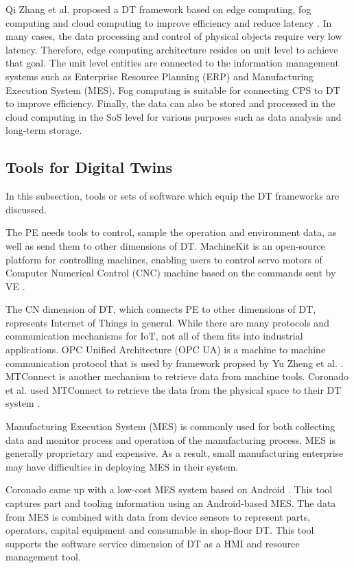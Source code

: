 \documentclass[article,table]{aaltoseries}
\begin{document}
Qi Zhang et al. proposed a DT framework based on edge computing, fog computing and cloud computing to improve efficiency and reduce latency \cite{qi2018modeling}. In many cases, the data processing and control of physical objects require very low latency. Therefore, edge computing architecture resides on unit level to achieve that goal. The unit level entities are connected to the information management systems such as Enterprise Resource Planning (ERP) and Manufacturing Execution System (MES). Fog computing is suitable for connecting CPS to DT to improve efficiency. Finally, the data can also be stored and processed in the cloud computing in the SoS level for various purposes such as data analysis and long-term storage.

\subsection{Tools for Digital Twins}
In this subsection, tools or sets of software which equip the DT frameworks are discussed. 

The PE needs tools to control, sample the operation and environment data, as well as send them to other dimensions of DT. MachineKit is an open-source platform for controlling machines, enabling users to control servo motors of Computer Numerical Control (CNC) machine based on the commands sent by VE \cite{lynn2018realization}.

The CN dimension of DT, which connects PE to other dimensions of DT, represents Internet of Things in general. While there are many protocols and communication mechanisms for IoT, not all of them fits into industrial applications. OPC Unified Architecture (OPC UA) is a machine to machine communication protocol that is used by framework propsed by Yu Zheng et al. \cite{zheng2019application}. MTConnect is another mechanism to retrieve data from machine tools. Coronado et al. used MTConnect to retrieve the data from the physical space to their DT system \cite{UrbinaCoronado2018}.

Manufacturing Execution System (MES) is commonly used for both collecting data and monitor process and operation of the manufacturing process. MES is generally proprietary and expensive. As a result, small manufacturing enterprise may have difficulties in deploying MES in their system.

Coronado  came up with a low-cost MES system based on Android \cite{UrbinaCoronado2018}. This tool captures part and tooling information using an Android-based MES. The data from MES is combined with data from device sensors to represent parts, operators, capital equipment and consumable in shop-floor DT. This tool supports the software service dimension of DT as a HMI and resource management tool.
\end{document}
